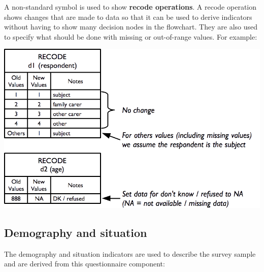 \documentclass[12pt,a4paper]{book}
\theoremstyle{definition}
\theoremstyle{definition}
\theoremstyle{definition}
\theoremstyle{remark}
\begin{document}
A non-standard symbol is used to show \textbf{recode operations}. A
recode operation shows changes that are made to data so that it can be
used to derive indicators without having to show many decision nodes in
the flowchart. They are also used to specify what should be done with
missing or out-of-range values. For example:

\begin{center}\includegraphics[width=800pt]{figures/indicators02} \end{center}

\hypertarget{demography-and-situation}{%
\subsection{Demography and situation}\label{demography-and-situation}}

The demography and situation indicators are used to describe the survey
sample and are derived from this questionnaire component:
\end{document}
